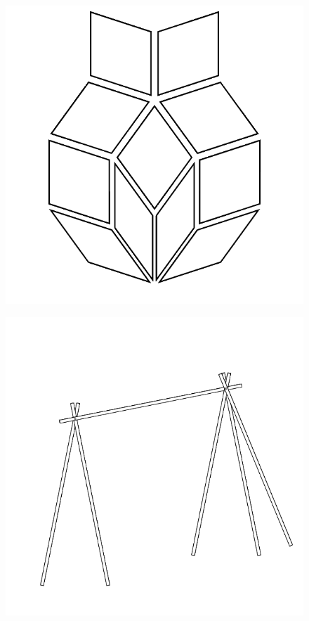 \documentclass[17pt]{extreport}
\begin{document}
	\begin{figure}
		\centering
		\includegraphics[width=6.25in]{imageserver/uploadimages/pi.png}
	\end{figure}
	
	\begin{figure}
		\centering
		\includegraphics[width=6.25in]{imageserver/uploadimages/image9.png}
	\end{figure}
	
\end{document}
